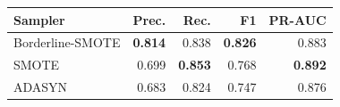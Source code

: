 \begin{tabular}{@{}lrrrr@{}}
\toprule
Sampler & Prec. & Rec. & F1 & PR-AUC \\
\midrule
Borderline-SMOTE & \textbf{0.814} & 0.838 & \textbf{0.826} & 0.883 \\
SMOTE & 0.699 & \textbf{0.853} & 0.768 & \textbf{0.892} \\
ADASYN & 0.683 & 0.824 & 0.747 & 0.876 \\
\bottomrule
\end{tabular}
